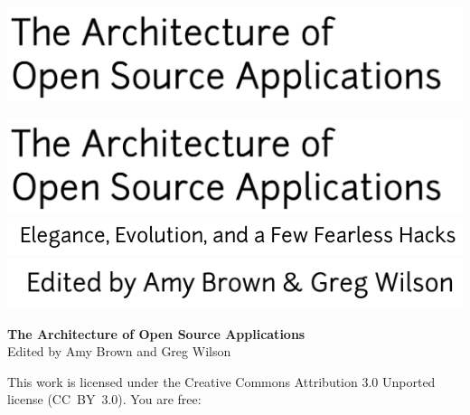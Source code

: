 \newpage

\thispagestyle{empty}
\hspace{-2cm}\includegraphics[width=400pt]{../images/frontmatter/title} 

\newpage

\thispagestyle{empty}
\mbox{}    %

\newpage

\thispagestyle{empty}
\hspace{-2cm}\includegraphics[width=400pt]{../images/frontmatter/title} 
\\
\vspace{0.5cm}
\hspace{2.8cm}\includegraphics{../images/frontmatter/subtitle}
\\[13.5cm]
\vspace{0.5cm}
\hspace{6.5cm}\includegraphics{../images/frontmatter/eds}

\newpage

\thispagestyle{empty}

\small
\noindent \textbf{The Architecture of Open Source Applications} \\
Edited by Amy Brown and Greg Wilson

\vspace{0.15cm}

\noindent
This work is licensed under the Creative Commons Attribution 3.0
Unported license (CC~BY~3.0).  You are free:

